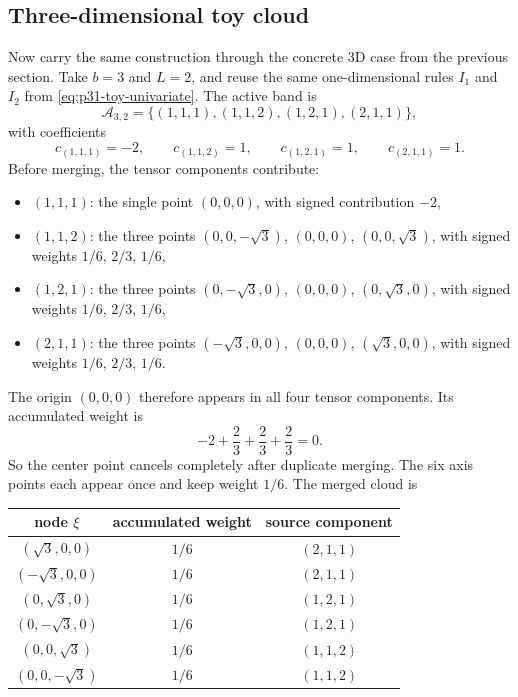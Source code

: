 \documentclass[11pt]{article}
\numberwithin{equation}{section}
\begin{document}
\subsection{Three-dimensional toy cloud}

Now carry the same construction through the concrete 3D case from the previous
section.  Take \(b=3\) and \(L=2\), and reuse the same one-dimensional rules
\(I_1\) and \(I_2\) from \eqref{eq:p31-toy-univariate}.  The active band is
\begin{equation}
  \mathcal A_{3,2}
  =
  \{(1,1,1),(1,1,2),(1,2,1),(2,1,1)\},
  \label{eq:p38-3d-toy-indices}
\end{equation}
with coefficients
\begin{equation}
  c_{(1,1,1)}=-2,
  \qquad
  c_{(1,1,2)}=1,
  \qquad
  c_{(1,2,1)}=1,
  \qquad
  c_{(2,1,1)}=1.
  \label{eq:p38-3d-toy-coefficients}
\end{equation}
Before merging, the tensor components contribute:
\begin{itemize}[leftmargin=0.28in]
  \item \((1,1,1)\): the single point \((0,0,0)\), with signed contribution
  \(-2\),
  \item \((1,1,2)\): the three points
  \((0,0,-\sqrt3)\), \((0,0,0)\), \((0,0,\sqrt3)\), with signed weights
  \(1/6\), \(2/3\), \(1/6\),
  \item \((1,2,1)\): the three points
  \((0,-\sqrt3,0)\), \((0,0,0)\), \((0,\sqrt3,0)\), with signed weights
  \(1/6\), \(2/3\), \(1/6\),
  \item \((2,1,1)\): the three points
  \((-\sqrt3,0,0)\), \((0,0,0)\), \((\sqrt3,0,0)\), with signed weights
  \(1/6\), \(2/3\), \(1/6\).
\end{itemize}
The origin \((0,0,0)\) therefore appears in all four tensor components.  Its
accumulated weight is
\begin{equation}
  -2+\frac23+\frac23+\frac23=0.
  \label{eq:p38-3d-origin-weight}
\end{equation}
So the center point cancels completely after duplicate merging.  The six axis
points each appear once and keep weight \(1/6\).  The merged cloud is
\begin{center}
\begin{tabular}{ccc}
\toprule
node \(\xi\) & accumulated weight & source component \\
\midrule
\((\sqrt3,0,0)\) & \(1/6\) & \((2,1,1)\) \\
\(( -\sqrt3,0,0)\) & \(1/6\) & \((2,1,1)\) \\
\((0,\sqrt3,0)\) & \(1/6\) & \((1,2,1)\) \\
\((0,-\sqrt3,0)\) & \(1/6\) & \((1,2,1)\) \\
\((0,0,\sqrt3)\) & \(1/6\) & \((1,1,2)\) \\
\((0,0,-\sqrt3)\) & \(1/6\) & \((1,1,2)\) \\
\bottomrule
\end{tabular}
\end{center}
\end{document}
